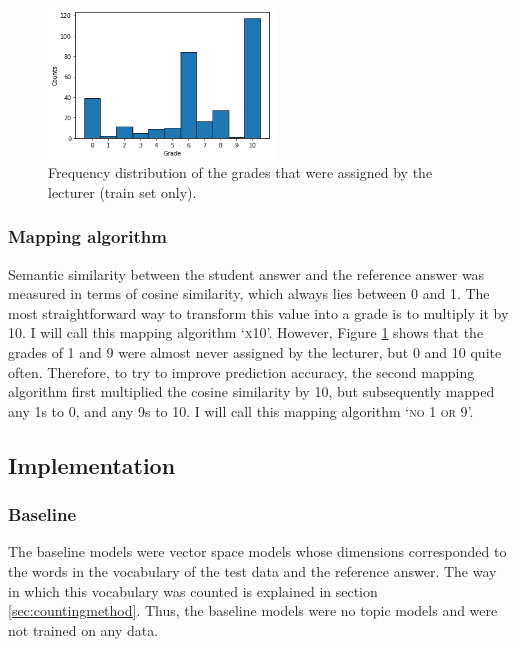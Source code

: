 \documentclass[a4paper,10pt,twoside]{article}
\begin{document}
\begin{figure}
	\vspace{-15pt}
	\includegraphics[width=6cm]{"Histogram of grades"}
	\caption{Frequency distribution of the grades that were assigned by the lecturer (train set only).}
	\label{fig:histogram}
	\vspace{-45pt}
\end{figure} 

\subsubsection{Mapping algorithm}
Semantic similarity between the student answer and the reference answer was measured in terms of cosine similarity, which always lies between 0 and 1. The most straightforward way to transform this value into a grade is to multiply it by 10. I will call this mapping algorithm `\textsc{x10}'. However, Figure \ref{fig:histogram} shows that the grades of 1 and 9 were almost never assigned by the lecturer, but 0 and 10 quite often. Therefore, to try to improve prediction accuracy, the second mapping algorithm first multiplied the cosine similarity by 10, but subsequently mapped any 1s to 0, and any 9s to 10. I will call this mapping algorithm `\textsc{no 1 or 9}'.


\subsection{Implementation}

\subsubsection{Baseline}
The baseline models were vector space models whose dimensions corresponded to the words in the vocabulary of the test data and the reference answer. The way in which this vocabulary was counted is explained in section \ref{sec:countingmethod}. Thus, the baseline models were no topic models and were not trained on any data.
\end{document}
